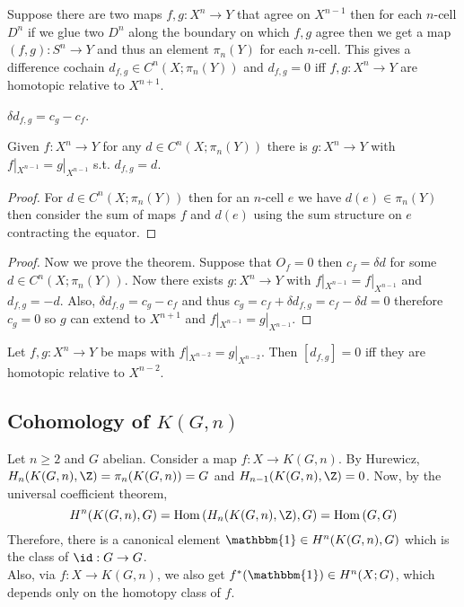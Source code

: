 \documentclass[12pt]{extarticle}
\begin{document}
\begin{definition}
Suppose there are two maps $f, g : X^n \to Y$ that agree on $X^{n-1}$ then for each $n$-cell $D^n$ if we glue two $D^n$ along the boundary on which $f,g$ agree then we get a map $(f, g) : S^n \to Y$ and thus an element $\pi_n(Y)$ for each $n$-cell. This gives a difference cochain $d_{f,g} \in C^n(X ; \pi_n(Y))$ and $d_{f,g} = 0$ iff $f,g : X^n \to Y$ are homotopic relative to $X^{n+1}$.  
\end{definition}

\begin{lemma}
$\delta d_{f,g} = c_g - c_f$.
\end{lemma}

\begin{lemma}
Given $f : X^n \to Y$ for any $d \in C^n(X; \pi_n(Y))$ there is $g : X^n \to Y$ with $f|_{X^{n-1}} = g|_{X^{n-1}}$ s.t. $d_{f,g} = d$. 
\end{lemma}

\begin{proof}
For $d \in C^n(X; \pi_n(Y))$ then for an $n$-cell $e$ we have $d(e) \in \pi_n(Y)$ then consider the sum of maps $f$ and $d(e)$ using the sum structure on $e$ contracting the equator. 
\end{proof}

\begin{proof}
Now we prove the theorem. Suppose that $O_f = 0$ then $c_f = \delta d$ for some $d \in C^n(X ; \pi_n(Y))$. Now there exists $g : X^n \to Y$ with $f|_{X^{n-1}} = f|_{X^{n-1}}$ and $d_{f,g} = -d$. Also, $\delta d_{f,g} = c_g - c_f$ and thus $c_g = c_f + \delta d_{f,g} = c_f - \delta d = 0$ therefore $c_g = 0$ so $g$ can extend to $X^{n+1}$ and $f|_{X^{n-1}} = g|_{X^{n-1}}$. 
\end{proof}

\begin{theorem}
Let $f,g : X^n \to Y$ be maps with $f|_{X^{n-2}} = g|_{X^{n-2}}$. Then $[d_{f,g}] = 0$ iff they are homotopic relative to $X^{n-2}$. 
\end{theorem}

\subsection{Cohomology of $K(G, n)$}

Let $n \ge 2$ and $G$ abelian. Consider a map $f : X \to K(G, n)$. By Hurewicz, $H_n(K(G, n), \Z) = \pi_n(K(G, n)) = G$ and $H_{n-1}(K(G, n), \Z) = 0$. Now, by the universal coefficient theorem,
\[ H^n(K(G, n), G) = \Hom{H_n(K(G, n), \Z)}{G} = \Hom{G}{G} \]
Therefore, there is a canonical element $\mathbbm{1} \in H^n(K(G, n), G)$ which is the class of $\id : G \to G$. 
\bigskip\\
Also, via $f : X \to K(G, n)$, we also get $f^*(\mathbbm{1}) \in H^n(X ; G)$, which depends only on the homotopy class of $f$. 
\end{document}
